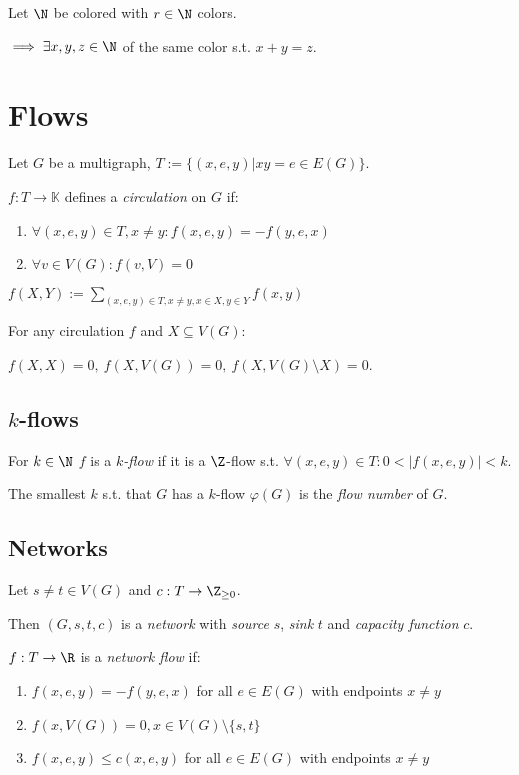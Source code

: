Let $\N$ be colored with $r \in \N$ colors.

$\implies \exists x, y, z \in \N$ of the same color s.t. $x+y=z$.

\section*{Flows}

Let $G$ be a multigraph, $T := \{(x,e,y) | xy = e \in E(G)\}$.

$f : T \to \mathbb{K}$ defines a \emph{circulation} on $G$ if:

\begin{enumerate}
	\item $\forall (x,e,y) \in T, x \neq y : f(x,e,y) = -f(y,e,x)$
	\item $\forall v \in V(G) : f(v,V) = 0$
\end{enumerate}

$f(X,Y) := \displaystyle\sum_{(x,e,y) \in T, x \neq y, x \in X, y \in Y} f(x,y)$

For any circulation $f$ and $X \subseteq V(G)$:

$f(X,X)=0, \ f(X,V(G))=0, \ f(X,V(G) \setminus X)=0$.

\subsection*{$k$-flows}

For $k \in \N$ $f$ is a \emph{$k$-flow} if it is a $\Z$-flow s.t. $\forall (x,e,y) \in T : 0 < |f(x,e,y)| < k$.

\spacing

The smallest $k$ s.t. that $G$ has a $k$-flow $\varphi(G)$ is the \emph{flow number} of $G$.

\subsection*{Networks}

Let $s \neq t \in V(G)$ and $c : T \to \Z_{\geq0}$.

Then $(G,s,t,c)$ is a \emph{network} with \emph{source} $s$, \emph{sink} $t$ and \emph{capacity function} $c$.

\spacing

$f : T \to \R$ is a \emph{network flow} if:

\begin{enumerate}
	\item $f(x,e,y) = -f(y,e,x)$ for all $e \in E(G)$ with endpoints $x \neq y$
	\item $f(x,V(G))=0, x \in V(G) \setminus \{s,t\}$
	\item $f(x,e,y) \leq c(x,e,y)$ for all $e \in E(G)$ with endpoints $x \neq y$
\end{enumerate}

